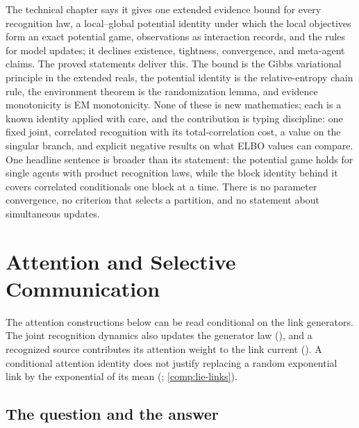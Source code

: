 \begin{verdictbox}{\DELIVERED}
The technical chapter says it gives one extended evidence bound for every recognition law, a local--global
potential identity under which the local objectives form an exact potential game, observations as interaction
records, and the rules for model updates; it declines existence, tightness, convergence, and meta-agent claims.
The proved statements deliver this. The bound is the Gibbs variational principle in the extended reals, the
potential identity is the relative-entropy chain rule, the environment theorem is the randomization lemma, and
evidence monotonicity is EM monotonicity. None of these is new mathematics; each is a known identity applied with
care, and the contribution is typing discipline: one fixed joint, correlated recognition with its
total-correlation cost, a value on the singular branch, and explicit negative results on what ELBO values can
compare. One headline sentence is broader than its statement: the potential game holds for single agents with
product recognition laws, while the block identity behind it covers correlated conditionals one block at a time.
There is no parameter convergence, no criterion that selects a partition, and no statement about simultaneous
updates.
\end{verdictbox}

\chapter{Attention and Selective Communication}
\label{comp:ch06}

The attention constructions below can be read conditional on the link generators. The joint
recognition dynamics also updates the generator law (), and a recognized source contributes its
attention weight to the link current (). A conditional attention identity
does not justify replacing a random exponential link by the exponential of its mean
(; \cref{comp:lie-links}).

\section{The question and the answer}
\label{comp:ch06-question}

